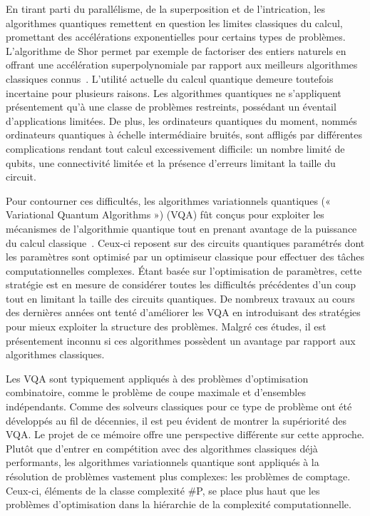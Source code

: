 \Introduction   %


En tirant parti du parallélisme, de la superposition et de l'intrication, les algorithmes quantiques remettent en question les limites classiques du calcul, promettant des accélérations exponentielles pour certains types de problèmes. L'algorithme de Shor permet par exemple de factoriser des entiers naturels en offrant une accélération superpolynomiale par rapport aux 
meilleurs algorithmes classiques connus~\cite{shorAlgorithmsQuantumComputation1994}. L'utilité actuelle du calcul quantique demeure toutefois incertaine pour plusieurs raisons. Les algorithmes quantiques ne s'appliquent présentement qu'à une classe de problèmes restreints, possédant un éventail d'applications limitées. De plus, les ordinateurs quantiques du moment, nommés ordinateurs quantiques à échelle intermédiaire bruités, sont affligés par différentes complications rendant tout calcul excessivement difficile: un nombre limité de qubits, une connectivité limitée et la présence d'erreurs limitant la taille du circuit.

Pour contourner ces difficultés, les algorithmes variationnels quantiques (« Variational Quantum Algorithms ») (VQA) fût conçus pour exploiter les mécanismes de l'algorithmie quantique tout en prenant avantage de la puissance du calcul classique~\cite{cerezoVariationalQuantumAlgorithms2021}. Ceux-ci reposent sur des circuits quantiques paramétrés dont les paramètres sont optimisé par un optimiseur classique pour effectuer des tâches computationnelles complexes. Étant basée sur l'optimisation de paramètres, cette stratégie est en mesure de considérer toutes les difficultés précédentes d'un coup tout en limitant la taille des circuits quantiques. De nombreux travaux au cours des dernières années ont tenté d'améliorer les VQA en introduisant des stratégies pour mieux exploiter la structure des problèmes. Malgré ces études, il est présentement inconnu si ces algorithmes possèdent un avantage par rapport aux algorithmes classiques. 

Les VQA sont typiquement appliqués à des problèmes d'optimisation combinatoire, comme le problème de coupe maximale et d'ensembles indépendants. Comme des solveurs classiques pour ce type de problème ont été développés au fil de décennies, il est peu évident de montrer la supériorité des VQA. Le projet de ce mémoire offre une perspective différente sur cette approche. Plutôt que d'entrer en compétition avec des algorithmes classiques déjà performants, les algorithmes variationnels quantique sont appliqués à la résolution de problèmes vastement plus complexes: les problèmes de comptage. Ceux-ci, éléments de la classe complexité \textsf{\#P}, se place plus haut que les problèmes d'optimisation dans la hiérarchie de la complexité computationnelle. 


